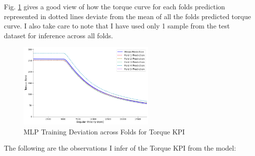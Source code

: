 \documentclass{report} %
\begin{document}
Fig. \ref{fig:MLP Training Deviation across Folds for Torque KPI} gives a good view of how the torque curve for each folds prediction represented in dotted lines deviate 
from the mean of all the folds predicted torque curve. I also take care to note that I have used only 1 sample from the test dataset for inference across all folds.\\

\begin{figure}[H]
    \centering
    \includegraphics[width=0.6\textwidth]{./ReportImages/folds_dev_y1.png} 
    \caption{MLP Training Deviation across Folds for Torque \ac{KPI}} 
    \label{fig:MLP Training Deviation across Folds for Torque KPI}
\end{figure}

The following are the observations I infer of the Torque \ac{KPI} from the model:
\end{document}
